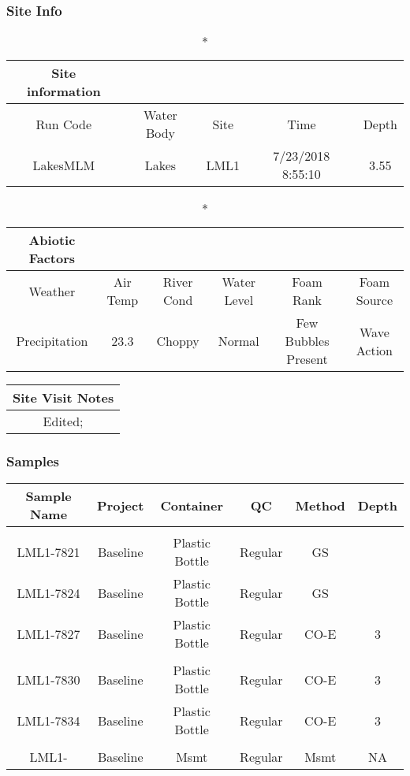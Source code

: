 \documentclass[
  letterpaper,
  DIV=11,
  numbers=noendperiod]{scrartcl}
\begin{document}
\subsubsection{Site Info}

\begin{longtable*}{ccccc}
\caption*{
{\large Site information}
} \\ 
\toprule
Run Code & Water Body & Site & Time & Depth \\ 
\midrule\addlinespace[2.5pt]
LakesMLM & Lakes & LML1 & 7/23/2018 8:55:10 & 3.55 \\ 
\bottomrule
\end{longtable*}

\begin{longtable*}{cccccc}
\caption*{
{\large Abiotic Factors}
} \\ 
\toprule
Weather & Air Temp & River Cond & Water Level & Foam Rank & Foam Source \\ 
\midrule\addlinespace[2.5pt]
Precipitation & 23.3 & Choppy & Normal & Few Bubbles Present & Wave Action \\ 
\bottomrule
\end{longtable*}

\begin{longtable*}{c}
\toprule
Site Visit Notes \\ 
\midrule\addlinespace[2.5pt]
Edited; \\ 
\bottomrule
\end{longtable*}

\subsubsection{Samples}

\begin{longtable*}{cccccc}
\toprule
Sample Name & Project & Container & QC & Method & Depth \\ 
\midrule\addlinespace[2.5pt]
 \\ 
\midrule\addlinespace[2.5pt]
LML1-7821 & Baseline & Plastic Bottle & Regular & GS &  \\ 
LML1-7824 & Baseline & Plastic Bottle & Regular & GS &  \\ 
LML1-7827 & Baseline & Plastic Bottle & Regular & CO-E & 3 \\ 
\midrule\addlinespace[2.5pt]
 \\ 
\midrule\addlinespace[2.5pt]
LML1-7830 & Baseline & Plastic Bottle & Regular & CO-E & 3 \\ 
LML1-7834 & Baseline & Plastic Bottle & Regular & CO-E & 3 \\ 
\midrule\addlinespace[2.5pt]
 \\ 
\midrule\addlinespace[2.5pt]
LML1- & Baseline & Msmt & Regular & Msmt & NA \\ 
\bottomrule
\end{longtable*}
\end{document}
